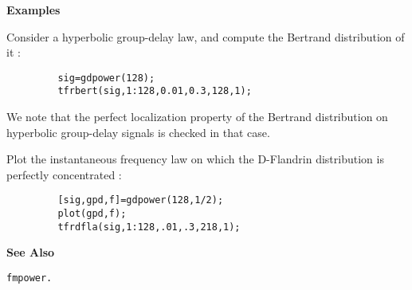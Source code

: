 {\bf \large {}\selectfont Examples}\\
\hspace*{1.5cm}
\begin{minipage}[t]{13.5cm}
Consider a hyperbolic group-delay law, and compute the Bertrand
distribution of it :
\begin{verbatim}
         sig=gdpower(128); 
         tfrbert(sig,1:128,0.01,0.3,128,1);
\end{verbatim}
We note that the perfect localization property of the Bertrand distribution
on hyperbolic group-delay signals is checked in that case. \\
\end{minipage}
\newpage
\hspace*{1.5cm}\begin{minipage}[t]{13.5cm}
Plot the instantaneous frequency law on which the D-Flandrin distribution
is perfectly concentrated :
\begin{verbatim}
         [sig,gpd,f]=gdpower(128,1/2); 
         plot(gpd,f); 
         tfrdfla(sig,1:128,.01,.3,218,1);
\end{verbatim}
\end{minipage}
\vspace*{.5cm}


{\bf \large {}\selectfont See Also}\\
\hspace*{1.5cm}
\begin{minipage}[t]{13.5cm}
\begin{verbatim}
fmpower.
\end{verbatim}
\end{minipage}

